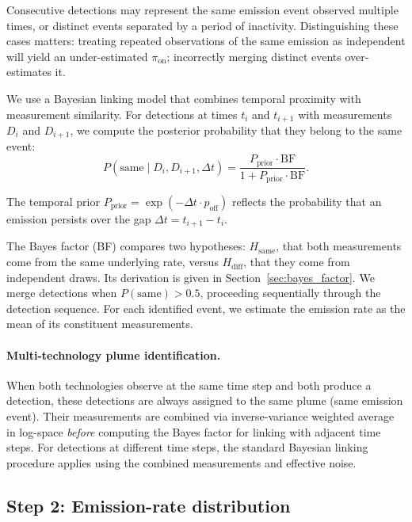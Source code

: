 \documentclass[11pt]{article}
\begin{document}
Consecutive detections may represent the same emission event observed multiple times, or distinct events separated by a period of inactivity. Distinguishing these cases matters: treating repeated observations of the same emission as independent will yield an under-estimated $\pi_\text{on}$; incorrectly merging distinct events over-estimates it.

We use a Bayesian linking model that combines temporal proximity with measurement similarity. For detections at times $t_i$ and $t_{i+1}$ with measurements $D_i$ and $D_{i+1}$, we compute the posterior probability that they belong to the same event:
\begin{equation}
    P(\text{same} \mid D_i, D_{i+1}, \Delta t) = \frac{P_{\text{prior}} \cdot \text{BF}}{1 + P_{\text{prior}} \cdot \text{BF}}.
\end{equation}

The temporal prior $P_{\text{prior}} = \exp(-\Delta t \cdot p_{\text{off}})$ reflects the probability that an emission persists over the gap $\Delta t = t_{i+1} - t_i$.

The Bayes factor (BF) compares two hypotheses: $H_{\text{same}}$, that both measurements come from the same underlying rate, versus $H_{\text{diff}}$, that they come from independent draws. Its derivation is given in Section~\ref{sec:bayes_factor}. We merge detections when $P(\text{same}) > 0.5$, proceeding sequentially through the detection sequence. For each identified event, we estimate the emission rate as the mean of its constituent measurements.

\paragraph{Multi-technology plume identification.}
When both technologies observe at the same time step and both produce a detection, these detections are always assigned to the same plume (same emission event). Their measurements are combined via inverse-variance weighted average in log-space \emph{before} computing the Bayes factor for linking with adjacent time steps. For detections at different time steps, the standard Bayesian linking procedure applies using the combined measurements and effective noise.



\subsection{Step 2: Emission-rate distribution}
\end{document}
